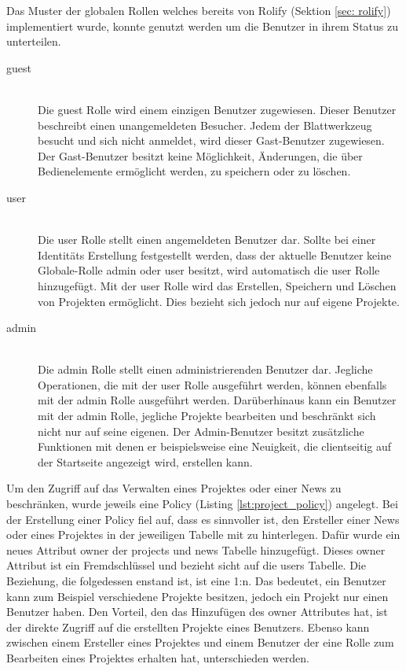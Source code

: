 Das Muster der globalen Rollen welches bereits von Rolify (Sektion \ref{sec: rolify}) implementiert wurde, konnte genutzt werden um die Benutzer in ihrem Status zu unterteilen.

\begin{description}
	\item[guest]\hfill\\
	Die guest Rolle wird einem einzigen Benutzer zugewiesen. Dieser Benutzer beschreibt einen unangemeldeten Besucher. Jedem der Blattwerkzeug besucht und sich nicht anmeldet, wird dieser Gast-Benutzer zugewiesen. Der Gast-Benutzer besitzt keine Möglichkeit, Änderungen, die über Bedienelemente ermöglicht werden, zu speichern oder zu löschen.
	\item[user]\hfill\\
	Die user Rolle stellt einen angemeldeten Benutzer dar. Sollte bei einer Identitäts Erstellung festgestellt werden, dass der aktuelle Benutzer keine Globale-Rolle admin oder user besitzt, wird automatisch die user Rolle hinzugefügt. Mit der user Rolle wird das Erstellen, Speichern und Löschen von Projekten ermöglicht. Dies bezieht sich jedoch nur auf eigene Projekte.
	\item[admin]\hfill\\
	Die admin Rolle stellt einen administrierenden Benutzer dar. Jegliche Operationen, die mit der user Rolle ausgeführt werden, können ebenfalls mit der admin Rolle ausgeführt werden. Darüberhinaus kann ein Benutzer mit der admin Rolle, jegliche Projekte bearbeiten und beschränkt sich nicht nur auf seine eigenen. Der Admin-Benutzer besitzt zusätzliche Funktionen mit denen er beispielsweise eine Neuigkeit, die clientseitig auf der Startseite angezeigt wird, erstellen kann.
\end{description}

Um den Zugriff auf das Verwalten eines Projektes oder einer News zu beschränken, wurde jeweils eine Policy (Listing \ref{lst:project_policy}) angelegt. Bei der Erstellung einer Policy fiel auf, dass es sinnvoller ist, den Ersteller einer News oder eines Projektes in der jeweiligen Tabelle mit zu hinterlegen. Dafür wurde ein neues Attribut owner der projects und news Tabelle hinzugefügt. Dieses owner Attribut ist ein Fremdschlüssel und bezieht sicht auf die users Tabelle. Die Beziehung, die folgedessen enstand ist, ist eine 1:n. Das bedeutet, ein Benutzer kann zum Beispiel verschiedene Projekte besitzen, jedoch ein Projekt nur einen Benutzer haben. Den Vorteil, den das Hinzufügen des owner Attributes hat, ist der direkte Zugriff auf die erstellten Projekte eines Benutzers. Ebenso kann zwischen einem Ersteller eines Projektes und einem Benutzer der eine Rolle zum Bearbeiten eines Projektes erhalten hat, unterschieden werden.

